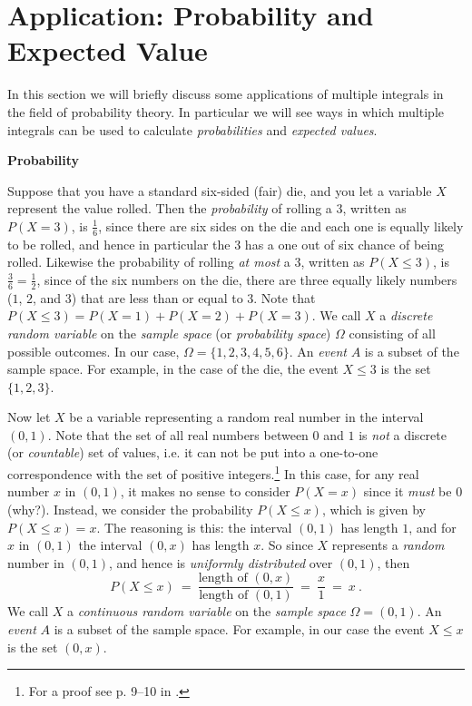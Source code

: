 \section{Application: Probability and Expected Value}
In this section we will briefly discuss some applications of multiple integrals in the field of
probability theory. In particular we will see ways in which multiple integrals can be used to calculate
\emph{probabilities} and \emph{expected values}.\medskip

\par\noindent\textbf{\large{Probability}}\normalsize\smallskip

Suppose that you have a standard six-sided (fair) die, and you let a variable $X$ represent the value rolled. Then the
\emph{probability} of rolling a $3$, written as $P(X=3)$, is $\frac{1}{6}$, since there are six sides on the die and
each one is equally likely to be rolled, and hence in particular the $3$ has a one out of six chance of being rolled.
Likewise the probability of rolling \emph{at most} a $3$, written as $P(X \le 3)$, is $\frac{3}{6} = \frac{1}{2}$,
since of the six numbers on the die, there are three equally likely numbers ($1$, $2$, and $3$) that are less than or
equal to $3$. Note that $P(X \le 3) = P(X=1) + P(X=2) + P(X=3)$. We call $X$ a \emph{discrete random variable} on the
\emph{sample space} (or \emph{probability space}) $\Omega$ consisting of all possible outcomes. In our case,
$\Omega = \lbrace 1,2,3,4,5,6 \rbrace$.
An \emph{event} $A$ is a subset of the sample space. For example, in the case of the die, the event $X \le 3$ is the set
$\lbrace 1,2,3 \rbrace$.

Now let $X$ be a variable representing a random real number in the interval $(0,1)$. Note that the set of all real
numbers between $0$ and $1$ is \emph{not} a discrete (or \emph{countable}) set of values, i.e. it can not be put into a
one-to-one correspondence with the set of positive integers.\footnote{For a proof see p. 9--10 in .}
In this case, for any real number
$x$ in $(0,1)$, it makes no sense to consider $P(X=x)$ since it \emph{must} be $0$ (why?). Instead, we consider the
probability $P(X \le x)$, which is given by $P(X \le x) = x$. The reasoning is this: the interval $(0,1)$ has length $1$,
and for $x$ in $(0,1)$ the interval $(0,x)$ has length $x$. So since $X$ represents a \emph{random} number in $(0,1)$,
and hence is \emph{uniformly distributed} over $(0,1)$, then
\begin{displaymath}
 P(X \le x) ~=~ \frac{\text{length of $(0,x)$}}{\text{length of $(0,1)$}} ~=~ \frac{x}{1} ~=~ x ~.
\end{displaymath}
We call $X$ a \emph{continuous random variable} on the \emph{sample space} $\Omega = (0,1)$. An \emph{event} $A$ is a
subset of the sample space. For example, in our case the event $X \le x$ is the set $(0,x)$.


